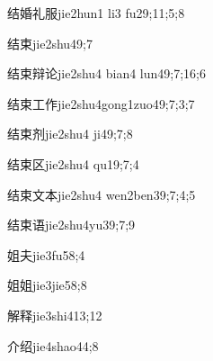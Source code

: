 \begin{verbete}{结婚礼服}{jie2hun1 li3 fu2}{9;11;5;8}
\end{verbete}

\begin{verbete}{结束}{jie2shu4}{9;7}
\end{verbete}

\begin{verbete}{结束辩论}{jie2shu4 bian4 lun4}{9;7;16;6}
\end{verbete}

\begin{verbete}{结束工作}{jie2shu4gong1zuo4}{9;7;3;7}
\end{verbete}

\begin{verbete}{结束剂}{jie2shu4 ji4}{9;7;8}
\end{verbete}

\begin{verbete}{结束区}{jie2shu4 qu1}{9;7;4}
\end{verbete}

\begin{verbete}{结束文本}{jie2shu4 wen2ben3}{9;7;4;5}
\end{verbete}

\begin{verbete}{结束语}{jie2shu4yu3}{9;7;9}
\end{verbete}

\begin{verbete}{姐夫}{jie3fu5}{8;4}
\end{verbete}

\begin{verbete}{姐姐}{jie3jie5}{8;8}
\end{verbete}

\begin{verbete}{解释}{jie3shi4}{13;12}
\end{verbete}

\begin{verbete}{介绍}{jie4shao4}{4;8}
\end{verbete}

